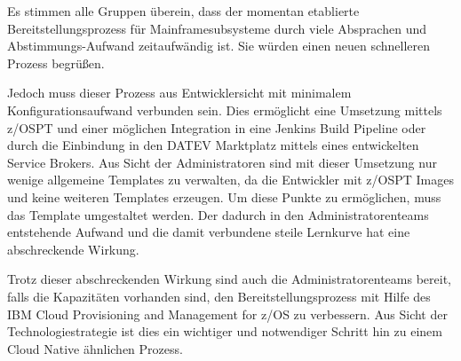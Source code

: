 Es stimmen alle Gruppen überein, dass der momentan etablierte Bereitstellungsprozess für Mainframesubsysteme durch viele Absprachen und Abstimmungs-Aufwand zeitaufwändig ist.
Sie würden einen neuen schnelleren Prozess begrüßen.

Jedoch muss dieser Prozess aus Entwicklersicht mit minimalem Konfigurationsaufwand verbunden sein.
Dies ermöglicht eine Umsetzung mittels z/OSPT und einer möglichen Integration in eine Jenkins Build Pipeline oder durch die Einbindung in den \glqq DATEV Marktplatz\grqq{} mittels eines entwickelten \glqq Service Brokers\grqq.
Aus Sicht der Administratoren sind mit dieser Umsetzung nur wenige allgemeine Templates zu verwalten, da die Entwickler mit z/OSPT Images und keine weiteren Templates erzeugen.
Um diese Punkte zu ermöglichen, muss das Template umgestaltet werden.
Der dadurch in den Administratorenteams entstehende Aufwand und die damit verbundene steile Lernkurve hat eine abschreckende Wirkung.

Trotz dieser abschreckenden Wirkung sind auch die Administratorenteams bereit, falls die Kapazitäten vorhanden sind, den Bereitstellungsprozess mit Hilfe des \glqq IBM Cloud Provisioning and Management for z/OS\grqq{} zu verbessern.
Aus Sicht der Technologiestrategie ist dies ein wichtiger und notwendiger Schritt hin zu einem Cloud Native ähnlichen Prozess.